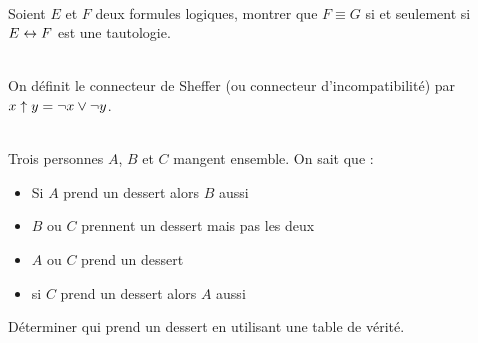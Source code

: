 \documentclass[11pt,a4paper]{article}
\begin{document}
\begin{Exercise}[title = {Où on trouve $\eq$, $\equiv$ et $\Leftrightarrow$}]\\
	Soient $E$ et $F$ deux formules logiques, montrer que $ F \equiv G$ si et seulement si $E \leftrightarrow F$ est une tautologie.
\end{Exercise}

\begin{Exercise}[title = {connecteur de Sheffer}]\\
	On définit le connecteur de Sheffer (ou connecteur d'incompatibilité) par $x \uparrow y = \neg x \vee \neg y$.

\end{Exercise}

\begin{Exercise}[title = {qui prend un dessert ?}] \\
	Trois personnes $A$, $B$ et $C$ mangent ensemble. On sait que :
	\begin{itemize}
		\item Si $A$ prend un dessert alors $B$ aussi
		\item $B$ ou $C$ prennent un dessert mais pas les deux
		\item $A$ ou $C$ prend un dessert
		\item si $C$ prend un dessert alors $A$ aussi
	\end{itemize}
	Déterminer qui prend un dessert en utilisant une table de vérité.
\end{Exercise}
\end{document}
